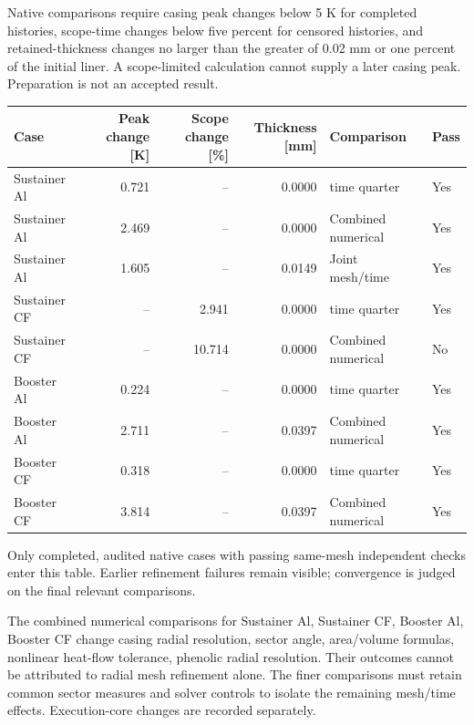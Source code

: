 \documentclass[oneside,openany]{amsdtx}
\begin{document}
Native comparisons require casing peak changes below 5 K for completed histories, scope-time changes below five percent for censored histories, and retained-thickness changes no larger than the greater of 0.02 mm or one percent of the initial liner. A scope-limited calculation cannot supply a later casing peak. Preparation is not an accepted result.

\begin{table}[H]\centering\scriptsize\begin{tabular}{lrrrll}\toprule Case & Peak change [K] & Scope change [\%] & Thickness [mm] & Comparison & Pass\\\midrule

Sustainer Al & 0.721 & -- & 0.0000 & time quarter & Yes \\
Sustainer Al & 2.469 & -- & 0.0000 & Combined numerical & Yes \\
Sustainer Al & 1.605 & -- & 0.0149 & Joint mesh/time & Yes \\
Sustainer CF & -- & 2.941 & 0.0000 & time quarter & Yes \\
Sustainer CF & -- & 10.714 & 0.0000 & Combined numerical & No \\
Booster Al & 0.224 & -- & 0.0000 & time quarter & Yes \\
Booster Al & 2.711 & -- & 0.0397 & Combined numerical & Yes \\
Booster CF & 0.318 & -- & 0.0000 & time quarter & Yes \\
Booster CF & 3.814 & -- & 0.0397 & Combined numerical & Yes \\

\bottomrule\end{tabular}\end{table}

Only completed, audited native cases with passing same-mesh independent checks enter this table. Earlier refinement failures remain visible; convergence is judged on the final relevant comparisons.

The combined numerical comparisons for Sustainer Al, Sustainer CF, Booster Al, Booster CF change casing radial resolution, sector angle, area/volume formulas, nonlinear heat-flow tolerance, phenolic radial resolution. Their outcomes cannot be attributed to radial mesh refinement alone. The finer comparisons must retain common sector measures and solver controls to isolate the remaining mesh/time effects. Execution-core changes are recorded separately.
\end{document}
